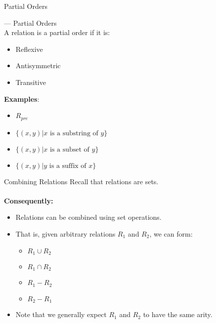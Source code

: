 \begin{slide}[bm=,toc=]{Partial Orders}
\begin{defn}{--- Partial Orders}~\\
\pause
A relation is a partial order if it is:

\begin{itemize}
\item<3-> Reflexive
\item<4-> Antisymmetric
\item<5-> Transitive
\end{itemize}
\end{defn}
\pause[4]
\textbf{Examples}:
\begin{itemize}
\item<7-> $R_{pre}$
\item<8-> $\{(x,y) | x \text{ is a substring of } y \}$
\item<9-> $\{(x,y) | x \text{ is a subset of } y \}$
\item<10-> $\{(x,y) | y \text{ is a suffix of } x \}$
\end{itemize}
\end{slide}
\begin{slide}[bm=,toc=]{Combining Relations}
Recall that relations are sets.
\\~\\
\pause
\textbf{Consequently:}~\\
\begin{itemize}
\item<3-> Relations can be combined using set operations.
\item<4-> That is, given arbitrary relations $R_1$ and $R_2$, we can form:
\begin{itemize}
\item<5-> $R_1 \cup R_2$
\item<6-> $R_1 \cap R_2$
\item<7-> $R_1 - R_2$
\item<8-> $R_2 - R_1$
\end{itemize}
\item<9-> Note that we generally expect $R_1$ and $R_2$ to have the same arity.
\end{itemize}
\end{slide}


